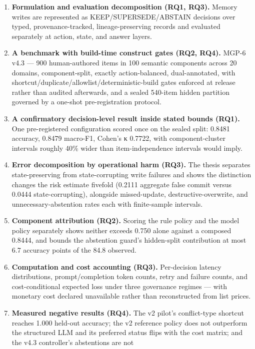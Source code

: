 \begin{enumerate}
\def\labelenumi{\arabic{enumi}.}
\tightlist
\item
  \textbf{Formulation and evaluation decomposition (RQ1, RQ3).} Memory
  writes are represented as KEEP/SUPERSEDE/ABSTAIN decisions over typed,
  provenance-tracked, lineage-preserving records and evaluated
  separately at action, state, and answer layers.
\item
  \textbf{A benchmark with build-time construct gates (RQ2, RQ4).} MGP-6
  v4.3 --- 900 human-authored items in 100 semantic components across 20
  domains, component-split, exactly action-balanced, dual-annotated,
  with shortcut/duplicate/allowlist/deterministic-build gates enforced
  at release rather than audited afterwards, and a sealed 540-item
  hidden partition governed by a one-shot pre-registration protocol.
\item
  \textbf{A confirmatory decision-level result inside stated bounds
  (RQ1).} One pre-registered configuration scored once on the sealed
  split: 0.8481 accuracy, 0.8479 macro-F1, Cohen's κ 0.7722, with
  component-cluster intervals roughly 40\% wider than item-independence
  intervals would imply.
\item
  \textbf{Error decomposition by operational harm (RQ3).} The thesis
  separates state-preserving from state-corrupting write failures and
  shows the distinction changes the risk estimate fivefold (0.2111
  aggregate false commit versus 0.0444 state-corrupting), alongside
  missed-update, destructive-overwrite, and unnecessary-abstention rates
  each with finite-sample intervals.
\item
  \textbf{Component attribution (RQ2).} Scoring the rule policy and the
  model policy separately shows neither exceeds 0.750 alone against a
  composed 0.8444, and bounds the abstention guard's hidden-split
  contribution at most 6.7 accuracy points of the 84.8 observed.
\item
  \textbf{Computation and cost accounting (RQ3).} Per-decision latency
  distributions, prompt/completion token counts, retry and failure
  counts, and cost-conditional expected loss under three governance
  regimes --- with monetary cost declared unavailable rather than
  reconstructed from list prices.
\item
  \textbf{Measured negative results (RQ4).} The v2 pilot's conflict-type
  shortcut reaches 1.000 held-out accuracy; the v2 reference policy does
  not outperform the structured LLM and its preferred status flips with
  the cost matrix; and the v4.3 controller's abstentions are not

\end{enumerate}
